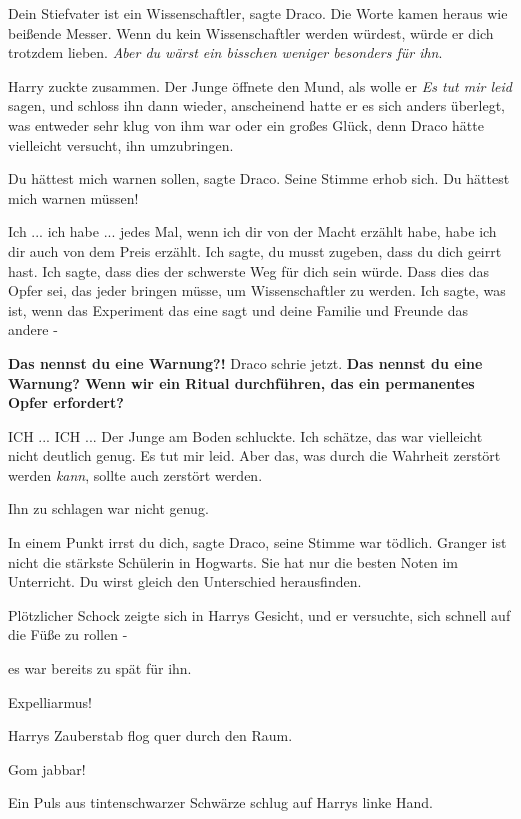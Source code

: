 \glqq{}Dein Stiefvater ist ein Wissenschaftler\grqq{}, sagte Draco. Die Worte
kamen heraus wie beißende Messer. \glqq{}Wenn du kein Wissenschaftler werden
würdest, würde er dich trotzdem lieben. \emph{Aber du wärst ein bisschen weniger
besonders für ihn}.\grqq{}

Harry zuckte zusammen. Der Junge öffnete den Mund, als wolle er \emph{ \glqq{}Es
tut mir leid\grqq{}} sagen, und schloss ihn dann wieder, anscheinend hatte er es
sich anders überlegt, was entweder sehr klug von ihm war oder ein großes Glück,
denn Draco hätte vielleicht versucht, ihn umzubringen.

\glqq{}Du hättest mich warnen sollen\grqq{}, sagte Draco. Seine Stimme erhob
sich. \glqq{}Du hättest mich warnen müssen!\grqq{}

\glqq{}Ich ... ich habe ... jedes Mal, wenn ich dir von der Macht erzählt habe,
habe ich dir auch von dem Preis erzählt. Ich sagte, du musst zugeben, dass du
dich geirrt hast. Ich sagte, dass dies der schwerste Weg für dich sein würde.
Dass dies das Opfer sei, das jeder bringen müsse, um Wissenschaftler zu werden.
Ich sagte, was ist, wenn das Experiment das eine sagt und deine Familie und
Freunde das andere -\grqq{}

\glqq{}\textbf{Das nennst du eine Warnung?!}\grqq{} Draco schrie jetzt. \textbf{
\glqq{}Das nennst du eine Warnung? Wenn wir ein Ritual durchführen, das ein
permanentes Opfer erfordert?\grqq{}}

\glqq{}ICH ... ICH ...\grqq{} Der Junge am Boden schluckte. \glqq{}Ich schätze,
das war vielleicht nicht deutlich genug. Es tut mir leid. Aber das, was durch
die Wahrheit zerstört werden \emph{kann}, sollte auch zerstört werden.\grqq{}

Ihn zu schlagen war nicht genug.

\glqq{}In einem Punkt irrst du dich\grqq{}, sagte Draco, seine Stimme war
tödlich. \glqq{}Granger ist nicht die stärkste Schülerin in Hogwarts. Sie hat
nur die besten Noten im Unterricht. Du wirst gleich den Unterschied
herausfinden.\grqq{}

Plötzlicher Schock zeigte sich in Harrys Gesicht, und er versuchte, sich schnell
auf die Füße zu rollen -

es war bereits zu spät für ihn.

\glqq{}Expelliarmus!\grqq{}

Harrys Zauberstab flog quer durch den Raum.

\glqq{}Gom jabbar!\grqq{}

Ein Puls aus tintenschwarzer Schwärze schlug auf Harrys linke Hand.

